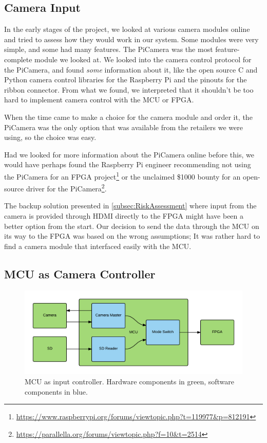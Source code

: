 \subsection{Camera Input}
\label{sec:camera_discussion}
In the early stages of the project,
we looked at various camera modules online and tried to assess how they would work in our system.
Some modules were very simple, and some had many features.
The PiCamera was the most feature-complete module we looked at.
We looked into the camera control protocol for the PiCamera,
and found \textit{some} information about it,
like the open source C and Python camera control libraries for the Raspberry Pi
and the pinouts for the ribbon connector.
From what we found, we interpreted that it shouldn't be too hard to implement camera control with the MCU or FPGA.

When the time came to make a choice for the camera module and order it,
the PiCamera was the only option that was available from the retailers we were using,
so the choice was easy.

Had we looked for more information about the PiCamera online before this,
we would have perhaps found the Raspberry Pi engineer recommending not using the PiCamera for an FPGA project\footnote{\url{https://www.raspberrypi.org/forums/viewtopic.php?t=119977&p=812191}} or the unclaimed \$1000 bounty for an open-source driver for the PiCamera\footnote{\url{https://parallella.org/forums/viewtopic.php?f=10&t=2514}}.

The backup solution presented in \ref{subsec:RiskAssessment} where input from the camera is provided through HDMI directly to the FPGA might have been a better option from the start.
Our decision to send the data through the MCU on its way to the FPGA was based on the wrong assumptions;
It was rather hard to find a camera module that interfaced easily with the MCU.

\subsection{MCU as Camera Controller}
\begin{figure}
    \centering
    \includegraphics[width=\linewidth]{img/MCU_CameraMaster}
    \caption{MCU as input controller. Hardware components in green, software components in blue.}
    \label{fig:MCU_CameraMaster}
\end{figure}

